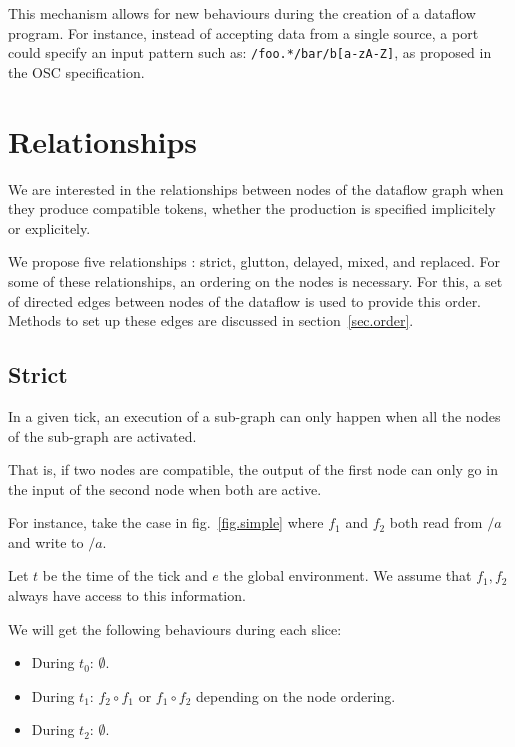 \documentclass{article}
\begin{document}
This mechanism allows for new behaviours during the creation of a dataflow program.
For instance, instead of accepting data from a single source, a port could specify an input pattern such as: \lstinline|/foo.*/bar/b[a-zA-Z]|, as proposed in the OSC specification.
	
	
    
\section{Relationships}
\label{sec.relationships}
We are interested in the relationships between nodes of the dataflow graph when they produce compatible tokens, whether the production is specified implicitely or explicitely.
    
We propose five relationships : strict, glutton, delayed, mixed, and replaced. 
For some of these relationships, an ordering on the nodes is necessary. 
For this, a set of directed edges between nodes of the dataflow is used to provide this order.
Methods to set up these edges are discussed in section~\ref{sec.order}.
    
\subsection{Strict}
In a given tick, an execution of a sub-graph can only happen when all the nodes of the sub-graph are activated.
    
That is, if two nodes are compatible, the output of the first node can only go in the input of the second node when both are active.
    
For instance, take the case in fig.~\ref{fig.simple} where $f_1$ and $f_2$ both read from $/a$ and write to $/a$.
    
Let $t$ be the time of the tick and $e$ the global environment. 
We assume that $f_1, f_2$ always have access to this information.
    
We will get the following behaviours during each slice: 
\begin{itemize}
  \item During $t_0$: $\emptyset$.
  \item During $t_1$: $f_2 \circ f_1 $ or $f_1 \circ f_2$ depending on the node ordering.
  \item During $t_2$: $\emptyset$. 
\end{itemize}
\end{document}
